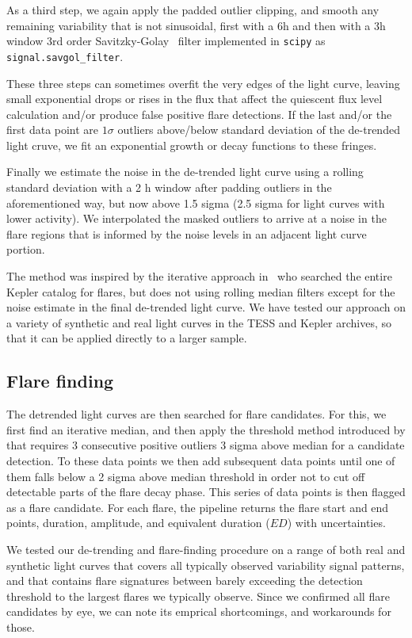 \documentclass[fleqn,usenatbib,letters]{mnras}%
\begin{document}
As a third step, we again apply the padded outlier clipping, and smooth any remaining variability that is not sinusoidal, first with a 6h and then with a 3h window 3rd order Savitzky-Golay~\citep{savitzky1964} filter implemented in \texttt{scipy} as \texttt{signal.savgol\_filter}.

These three steps can sometimes overfit the very edges of the light curve, leaving small exponential drops or rises in the flux that affect the quiescent flux level calculation and/or produce false positive flare detections. If the last and/or the first data point are $1\sigma$ outliers above/below standard deviation of the de-trended light cruve, we fit an exponential growth or decay functions to these fringes.

Finally we estimate the noise in the de-trended light curve using a rolling standard deviation with a 2 h window after padding outliers in the aforementioned way, but now above 1.5 sigma (2.5 sigma for light curves with lower activity). We interpolated the masked outliers to arrive at a noise in the flare regions that is informed by the noise levels in an adjacent light curve portion.

The method was inspired by the iterative approach in~\citet{davenport2016} who searched the entire Kepler catalog for flares, but does not using rolling median filters except for the noise estimate in the final de-trended light curve. We have tested our approach on a variety of synthetic and real light curves in the TESS and Kepler archives, so that it can be applied directly to a larger sample.

\subsection{Flare finding}

The detrended light curves are then searched for flare candidates. For this, we first find an iterative median, and then apply the threshold method introduced by \citep{chang2015} that requires 3 consecutive positive outliers 3 sigma above median for a candidate detection. To these data points we then add subsequent data points until one of them falls below a 2 sigma above median threshold in order not to cut off detectable parts of the flare decay phase. This series of data points is then flagged as a flare candidate. For each flare, the pipeline returns the flare start and end points, duration, amplitude, and equivalent duration ($ED$) with uncertainties.

We tested our de-trending and flare-finding procedure on a range of both real and synthetic light curves that covers all typically observed variability signal patterns, and that contains flare signatures between barely exceeding the detection threshold to the largest flares we typically observe. Since we confirmed all flare candidates by eye, we can note its emprical shortcomings, and workarounds for those. 
\end{document}
